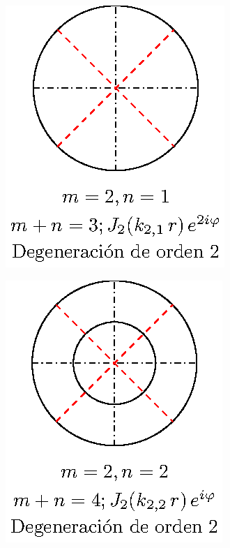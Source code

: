 \begin{minipage}{0.3\linewidth}
\begin{figure}[H]
    \centering
    \includegraphics[scale=1]{Imagenes/Modos_Vibracion_Membrana_2_1.eps}
\end{figure}
\end{minipage}
\begin{minipage}{0.3\linewidth}
\begin{figure}[H]
    \centering
    \includegraphics[scale=1]{Imagenes/Modos_Vibracion_Membrana_2_2.eps}
\end{figure}
\end{minipage}
